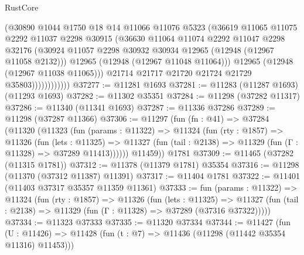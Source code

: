 \begin{lexlean}{RustCore}
\begin{coremodule}
                          (@30890
                            @1044
                            @1750
                            @18
                            @14
                            @11066
                            @11076
                            @5323
                            (@36619
                              @11065
                              @11075
                              @2292
                              @11037
                              @2298
                              @30915
                              (@36630
                                @11064
                                @11074
                                @2292
                                @11047
                                @2298
                                @32176
                                (@30924
                                  @11057
                                  @2298
                                  @30932
                                  @30934
                                  @12965
                                  (@12948 (@12967 @11058 @2132)))
                                @12965
                                (@12948 (@12967 @11048 @11064)))
                              @12965
                              (@12948 (@12967 @11038 @11065)))
                            @21714
                            @21717
                            @21720
                            @21724
                            @21729
                            @35803))))))))))))
@37277 := @11281 @1693
@37281 := @11283 (@11287 @1693) (@11293 @1693)
@37282 := @11302 @35351
@37284 := @11298 (@37282 @11317)
@37286 := @11340 (@11341 @1693)
@37287 := @11336 @37286
@37289 := @11298 (@37287 @11366)
@37306 := @11297
    (fun (fn : @41) =>
    @37284
      (@11320
        (@11323
          (fun (params : @11322) =>
          @11324
            (fun (rty : @1857) =>
            @11326
              (fun (lets : @11325) =>
              @11327 (fun (tail : @2138) => @11329 (fun (Γ : @11328) => @37289 @11413))))))
        @11459))
    @1781
@37309 := @11465 (@37282 (@11315 @1781))
@37312 := @11378 (@11379 @1781) @35354
@37316 := @11298 (@11370 (@37312 @11387) @11391)
@37317 := @11404 @1781
@37322 := @11401 (@11403 @37317 @35357 @11359 @11361)
@37333 := fun (params : @11322) =>
  @11324
    (fun (rty : @1857) =>
    @11326
      (fun (lets : @11325) =>
      @11327 (fun (tail : @2138) => @11329 (fun (Γ : @11328) => @37289 (@37316 @37322)))))
@37334 := @11323 @37333
@37335 := @11320 @37334
@37344 := @11427
    (fun (U : @11426) => @11428 (fun (t : @7) => @11436 (@11298 (@11442 @35354 @11316) @11453)))

\end{coremodule}
\end{lexlean}
